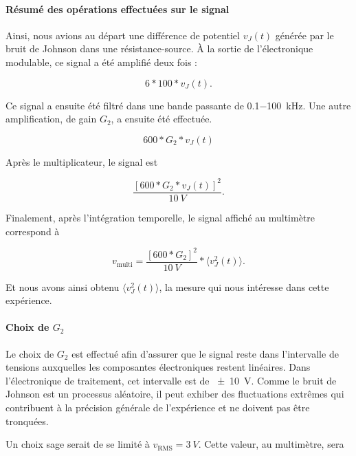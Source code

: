 \documentclass[12pt,oneside,letterpaper]{article}
\begin{document}
\paragraph{Résumé des opérations effectuées sur le signal}Ainsi, nous avions au départ une différence de potentiel $v_J\!\left(t\right)$ générée par le bruit de Johnson dans une résistance-source. À la sortie de l'électronique modulable, ce signal a été amplifié deux fois :


\begin{equation*}
6*100*v_J\!\left(t\right).
\end{equation*}


Ce signal a ensuite été filtré dans une bande passante de \SI{0.1-100}{kHz}. Une autre amplification, de gain $G_2$, a ensuite été effectuée.


\begin{equation*}
600*G_2*v_J\!\left(t\right)
\end{equation*}


Après le multiplicateur, le signal est


\begin{equation*}
\frac{[600*G_2*v_J\!\left(t\right)]^2}{\SI{10}{V}}.
\end{equation*}


Finalement, après l'intégration temporelle, le signal affiché au multimètre correspond à


\begin{equation*}
v_{\mathrm{multi}}=\frac{[600*G_2]^2}{\SI{10}{V}}* \langle v_{J}^{2}\!\left(t\right) \rangle.
\end{equation*}


Et nous avons ainsi obtenu $\langle v_{J}^{2}\!\left(t\right) \rangle$, la mesure qui nous intéresse dans cette expérience.


\paragraph{Choix de $G_2$} Le choix de $G_2$ est effectué afin d'assurer que le signal reste dans l'intervalle de tensions auxquelles les composantes électroniques restent linéaires. Dans l'électronique de traitement, cet intervalle est de \SI{\pm10}{V}. Comme le bruit de Johnson est un processus aléatoire, il peut exhiber des fluctuations extrêmes qui contribuent à la précision générale de l'expérience et ne doivent pas être tronquées.

Un choix sage serait de se limité à $v_{\mathrm{RMS}}=\SI{3}{V}$. Cette valeur, au multimètre, sera
\end{document}
